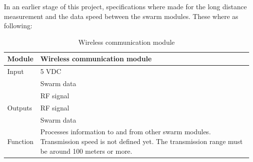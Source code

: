 \documentclass[10pt,a4paper]{article}
\begin{document}
In an earlier stage of this project, specifications where made for the long distance measurement and the data speed between the swarm modules. These where as following:

\begin{table}[h]
\centering
{}
\caption{Swarming localization specifications}
\label{smrange}
\end{table}

\begin{table}[H]
\centering
\caption{Wireless communication module}
\label{wcm}
\begin{tabular}{|p{}|p{}|}
\hline
Module   & Wireless communication module                                       \\ \hline
Input    & 5 VDC\\ 
        & Swarm data\\
        & RF signal                                              \\ \hline
Outputs  & RF signal                                           \\ 
& Swarm data \\ \hline
Function & Processes information to and from other swarm modules. Transmission speed is not defined yet. The transmission range must be around 100 meters or more. \\ \hline
\end{tabular}
\end{table}
\end{document}
